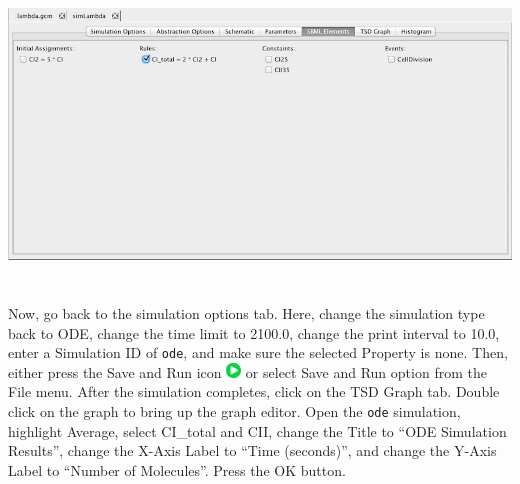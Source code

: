 \documentclass[titlepage,11pt]{article}
\begin{document}
\begin{center}
\includegraphics[height=80mm]{screenshots/SBMLElements}
\end{center}

Now, go back to the simulation options tab.  Here, change the simulation type back to ODE, change the time limit to 2100.0, change the print interval to 10.0, enter a Simulation ID of {\tt ode}, and make sure the selected Property is none.  Then, either press the Save and Run icon \includegraphics{../gui/icons/run-icon} or select Save and Run option from the File menu.
After the simulation completes, click on the TSD Graph tab.  Double click on the graph to bring up the graph editor.
Open the {\tt ode} simulation, highlight Average, select CI\_total and CII, change the Title to ``ODE Simulation Results'', change the X-Axis Label to ``Time (seconds)'', and change the Y-Axis Label to ``Number of Molecules''.  
Press the OK button.  
 
\end{document}

